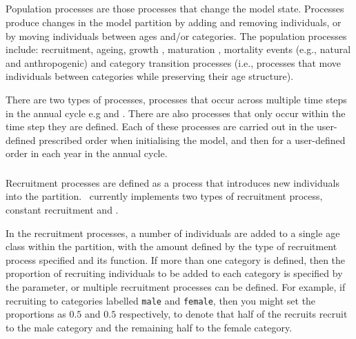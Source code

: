 \subsection{}
Population processes are those processes that change the model state. Processes produce changes in the model partition by adding and removing individuals, or by moving individuals between ages and/or categories. The population processes include: recruitment, ageing,  growth , maturation , mortality events (e.g., natural and anthropogenic) and category transition processes (i.e., processes that move individuals between categories while preserving their age structure). 

There are two types of processes, processes that occur across multiple time steps in the annual cycle e.g  and . There are also processes that only occur within the time step they are defined. Each of these processes are carried out in the user-defined prescribed order when initialising the model, and then for a user-defined order in each year in the annual cycle. 

\subsubsection{}

Recruitment processes are defined as a process that introduces new individuals into the partition. \CNAME\ currently implements two types of recruitment process, constant recruitment and   \citep{1203}.

In the recruitment processes, a number of individuals are added to a single age class within the partition, with the amount defined by the type of recruitment process specified and its function. If more than one category is defined, then the proportion of recruiting individuals to be added to each category is specified by the  parameter, or multiple recruitment processes can be defined. For example, if recruiting to categories labelled \texttt{male} and \texttt{female}, then you might set the proportions as $0.5$ and $0.5$ respectively, to denote that half of the recruits recruit to the male category and the remaining half to the female category. 

